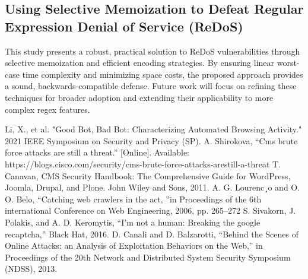 \documentclass[conference]{IEEEtran}
\begin{document}
\subsection{\textbf{Using Selective Memoization to Defeat Regular Expression Denial of Service (ReDoS)}}
This study presents a robust, practical solution to ReDoS vulnerabilities through selective memoization and efficient encoding strategies. By ensuring linear worst-case time complexity and minimizing space costs, the proposed approach provides a sound, backwards-compatible defense. Future work will focus on refining these techniques for broader adoption and extending their applicability to more complex regex features.


\begin{thebibliography}{00}
 Li, X., et al. "Good Bot, Bad Bot: Characterizing Automated Browsing Activity." 2021 IEEE Symposium on Security and Privacy (SP).
 A. Shirokova, “Cms brute force attacks are still a threat.” [Online]. Available: https://blogs.cisco.com/security/cms-brute-force-attacks-arestill-a-threat
 T. Canavan, CMS Security Handbook: The Comprehensive Guide for WordPress, Joomla, Drupal, and Plone. John Wiley and Sons, 2011.
A. G. Lourenc¸o and O. O. Belo, “Catching web crawlers in the act, ”in Proceedings of the 6th international Conference on Web Engineering, 2006, pp. 265–272
 S. Sivakorn, J. Polakis, and A. D. Keromytis, “I’m not a human: Breaking the google recaptcha,” Black Hat, 2016.
 D. Canali and D. Balzarotti, “Behind the Scenes of Online Attacks: an Analysis of Exploitation Behaviors on the Web,” in Proceedings of the 20th Network and Distributed System Security Symposium (NDSS), 2013.


\end{thebibliography}
\end{document}
